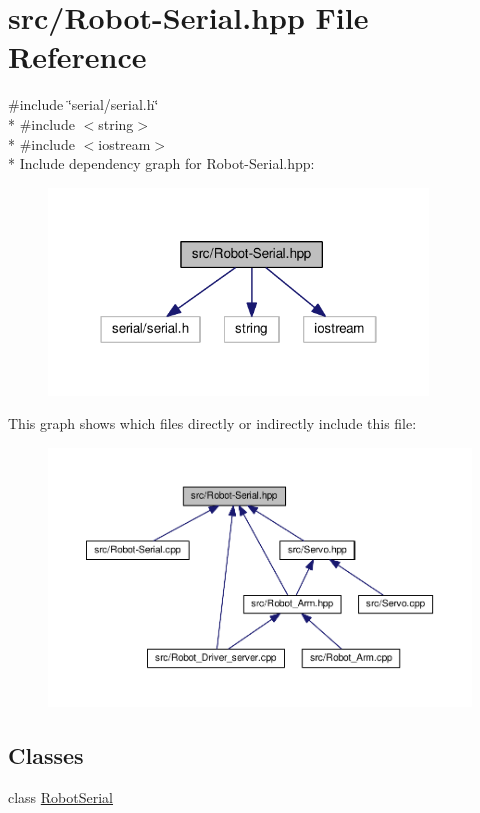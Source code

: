 \hypertarget{_robot-_serial_8hpp}{}\section{src/\+Robot-\/\+Serial.hpp File Reference}
\label{_robot-_serial_8hpp}
{\ttfamily \#include \char`\"{}serial/serial.\+h\char`\"{}}\\*
{\ttfamily \#include $<$string$>$}\\*
{\ttfamily \#include $<$iostream$>$}\\*
Include dependency graph for Robot-\/\+Serial.hpp\+:\nopagebreak
\begin{figure}[H]
\begin{center}
\leavevmode
\includegraphics[width=286pt]{_robot-_serial_8hpp__incl}
\end{center}
\end{figure}
This graph shows which files directly or indirectly include this file\+:\nopagebreak
\begin{figure}[H]
\begin{center}
\leavevmode
\includegraphics[width=350pt]{_robot-_serial_8hpp__dep__incl}
\end{center}
\end{figure}
\subsection*{Classes}
\begin{DoxyCompactItemize}
\item 
class \hyperlink{class_robot_serial}{Robot\+Serial}
\end{DoxyCompactItemize}

